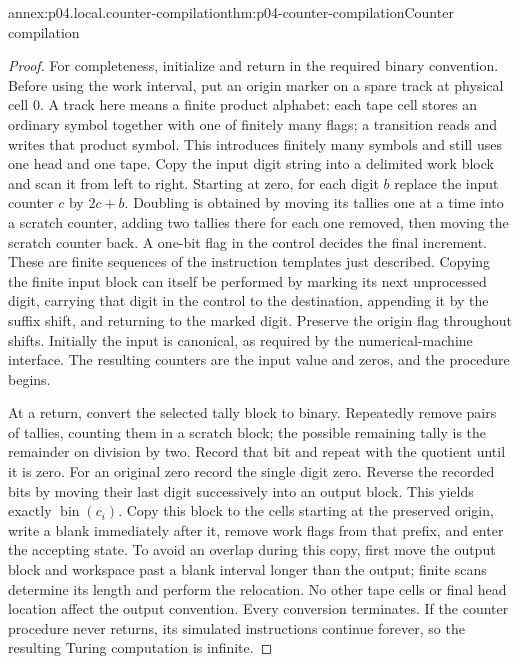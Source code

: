 \begin{annexitem}{annex:p04.local.counter-compilation}{thm:p04-counter-compilation}{Counter compilation}
\begin{proof}
For completeness, initialize and return in the required binary convention.
Before using the work interval, put an origin marker on a spare track
at physical cell \(0\).  A track here means a finite product alphabet:
each tape cell stores an ordinary symbol together with one of finitely
many flags; a transition reads and writes that product symbol.  This
introduces finitely many symbols and still uses one head and one tape.
Copy the input digit string into a delimited work block and scan it from
left to right.  Starting at zero, for each digit \(b\) replace the input
counter \(c\) by \(2c+b\).  Doubling is obtained by moving its tallies
one at a time into a scratch counter, adding two tallies there for each
one removed, then moving the scratch counter back.  A one-bit flag in
the control decides the final increment.  These are finite sequences
of the instruction templates just described.  Copying the finite input
block can itself be performed by marking its next unprocessed digit,
carrying that digit in the control to the destination, appending it by
the suffix shift, and returning to the marked digit.  Preserve the origin
flag throughout shifts.  Initially the input is canonical, as required
by the numerical-machine interface.  The resulting counters are the
input value and zeros, and the procedure begins.

At a return, convert the selected tally block to binary.  Repeatedly
remove pairs of tallies, counting them in a scratch block; the possible
remaining tally is the remainder on division by two.  Record that bit
and repeat with the quotient until it is zero.  For an original zero
record the single digit zero.  Reverse the recorded bits by moving
their last digit successively into an output block.  This yields exactly
\(\operatorname{bin}(c_i)\).  Copy this block to the cells starting at
the preserved origin, write a blank immediately after it, remove work
flags from that prefix, and enter the accepting state.  To avoid an
overlap during this copy, first move the output block and workspace
past a blank interval longer than the output; finite scans determine
its length and perform the relocation.  No other tape cells or final
head location affect the output convention.  Every conversion terminates.
If the counter procedure never returns, its simulated instructions
continue forever, so the resulting Turing computation is infinite.


\end{proof}
\end{annexitem}
